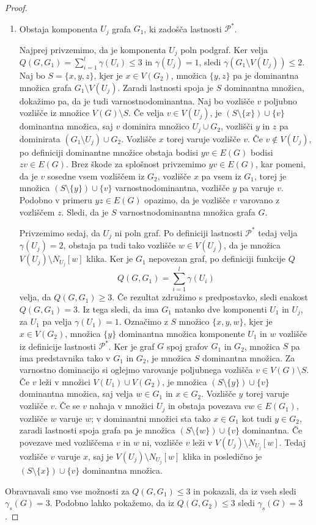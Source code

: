 \documentclass[12pt,a4paper,twoside]{article}
\theoremstyle{definition} %
\theoremstyle{plain} %
\numberwithin{equation}{section}  %
\begin{document}
\begin{proof}
\begin{enumerate}[label=($\roman*$)]
\item Obstaja komponenta $U_j$ grafa $G_1$, ki zadošča lastnosti $\mathcal{P^*}$.

Najprej privzemimo, da je komponenta $U_j$ poln podgraf. Ker velja $Q(G, G_1) = \sum\limits_{i=1}^l \gamma(U_i) \leq 3$ in $\gamma(U_j) = 1$, sledi $\gamma(G_1 \setminus V(U_j)) \leq 2$. Naj bo $S = \{x, y, z\}$, kjer je $x \in V(G_2)$, množica $\{y, z\}$ pa je dominantna množica grafa $G_1 \setminus V(U_j)$. Zaradi lastnosti spoja je $S$ dominantna množica, dokažimo pa, da je tudi varnostnodominantna. Naj bo vozlišče $v$ poljubno vozlišče iz množice $V(G) \setminus S$. Če velja $v \in V(U_j)$, je $(S \setminus \{x\}) \cup \{v\}$ dominantna množica, saj $v$ dominira množico $U_j \cup G_2$, vozlišči $y$ in $z$ pa dominirata $(G_1 \setminus U_j) \cup G_2$. Vozlišče $x$ torej varuje vozlišče $v$. Če $v \not\in V(U_j)$, po definiciji dominantne množice obstaja bodisi $yv \in E(G)$ bodisi $zv \in E(G)$. Brez škode za splošnost privzemimo  $yv \in E(G)$, kar pomeni, da je $v$ sosedne vsem vozliščem iz $G_2$, vozlišče $x$ pa vsem iz $G_1$, torej je množica $(S \setminus \{y\}) \cup \{v\}$ varnostnodominantna, vozlišče $y$ pa varuje $v$. Podobno v primeru $yz \in E(G)$ opazimo, da je vozlišče $v$ varovano z vozliščem $z$. Sledi, da je $S$ varnostnodominantna množica grafa $G$.

Privzemimo sedaj, da $U_j$ ni poln graf. Po definiciji lastnosti $\mathcal{P^*}$ tedaj velja $\gamma(U_j) = 2$, obstaja pa tudi tako vozlišče $w \in V(U_j)$, da je množica $V(U_j) \setminus N_{U_j}[w]$ klika. Ker je $G_1$ nepovezan graf, po definiciji funkcije $Q$ $$Q(G, G_1)= \sum\limits_{i=1}^l \gamma(U_i)$$ velja, da $Q(G, G_1) \geq 3$. Če rezultat združimo s predpostavko, sledi enakost $Q(G, G_1) = 3$. Iz tega sledi, da ima $G_1$ natanko dve komponenti $U_1$ in $U_j$, za $U_1$ pa velja $\gamma(U_1)=1$. Označimo z $S$ množico $\{x, y, w\}$, kjer je $x\in V(G_2)$, množica $\{y\}$ dominantna množica komponente $U_1$ in $w$ vozlišče iz definicije lastnosti $\mathcal{P^*}$. Ker je graf $G$ spoj grafov $G_1$ in $G_2$, množica $S$ pa ima predstavnika tako v $G_1$ in $G_2$, je množica $S$ dominantna množica. Za varnostno dominacijo si oglejmo varovanje poljubnega vozlišča $v \in V(G) \setminus S$. Če $v$ leži v množici $V(U_1) \cup V(G_2)$, je množica $(S \setminus \{y\}) \cup \{v\}$ dominantna množica, saj velja $w\in G_1$ in $x \in G_2$. Vozlišče $y$ torej varuje vozlišče $v$. Če se $v$ nahaja v množici $U_j$ in obstaja povezava $vw \in E(G_1)$, vozlišče $w$ varuje $w$; v dominantni množici sta tako $x\in G_1$ kot tudi $y \in G_2$, zaradi lastnosti spoja grafa pa je množica $(S \setminus \{w\}) \cup \{v\}$ dominantna. Če povezave med vozliščema $v$ in $w$ ni, vozlišče $v$ leži v $V(U_j) \setminus N_{U_j}[w]$. Tedaj vozlišče $v$ varuje $x$, saj je $V(U_j) \setminus N_{U_j}[w]$ klika in posledično je $(S \setminus \{x\}) \cup \{v\}$ dominantna množica.
 \end{enumerate}
Obravnavali smo vse možnosti za $Q(G, G_1) \leq 3$ in pokazali, da iz vseh sledi $\gamma_s(G) = 3$. Podobno lahko pokažemo, da iz  $Q(G, G_2) \leq 3$ sledi $\gamma_s(G) = 3$.
 \end{proof}
 
\end{document}
